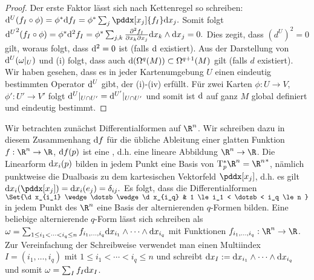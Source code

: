 \begin{st}
\begin{proof}
        Der erste Faktor lässt sich nach Kettenregel so schreiben:
        \begin{math}
            \d^U(f_I \circ \phi)
            = \phi^* \d f_I
            = \phi^* \sum_{j} \pddx[x_j]{f_I} \d x_j.
        \end{math}
        Somit folgt
        \begin{math}
            {\mathrm{d}^U}^2(f_I \circ \phi)
            = \phi^* \mathrm{d}^2 f_I
            = \phi^* \sum_{j,k} \frac{\partial^2 f_I}{\partial x_k \partial x_j} \mathrm{d} x_k \wedge \mathrm{d} x_j
            = 0.
        \end{math}
        Dies zegit, dass $(d^U)^2 = 0$ gilt, woraus folgt, dass $\mathrm{d}^2 = 0$ ist (falls $\mathrm{d}$ existiert).
        Aus der Darstellung von $\mathrm{d}^U(\omega|_U)$ und (i) folgt, dass auch $\mathrm{d}(\Omega^q(M)) \subset \Omega^{q+1}(M)$ gilt (falls $d$ existiert).
        Wir haben gesehen, dass es in jeder Kartenumgebung $U$ einen eindeutig bestimmten Operator $\mathrm{d}^U$ gibt, der (i)-(iv) erfüllt.
        Für zwei Karten  $\phi: U \to V$, $\phi': U' \to V'$ folgt $\mathrm{d}^U|_{U \cap U'} = \mathrm{d}^{U'}|_{U \cap U'}$ und somit ist $\mathrm{d}$ auf ganz $M$ global definiert und eindeutig bestimmt.
    \end{proof}
\end{st}

Wir betrachten zunächst Differentialformen auf $\R^n$.
Wir schreiben dazu in diesem Zusammenhang $\mathrm{d} f$ für die übliche Ableitung einer glatten Funktion $f:\R^n \to \R$, $\mathrm{d} f(p)$ ist eine , d.h. eine lineare Abbildung $\R^n \to \R$.
Die Linearform $\mathrm{d} x_i(p)$ bilden in jedem Punkt eine Basis von $\T_p^* \R^n = {\R^n}^*$, nämlich punktweise die Dualbasis zu dem kartesischen Vektorfeld $\pddx[x_j]$, d.h. es gilt
\begin{math}
    \d x_i (\pddx[x_j]) = \d x_i(e_j) = \delta_{ij}.
\end{math}
Es folgt, dass die Differentialformen
\begin{math}
    \Set{\d x_{i_1} \wedge \dotsb \wedge \d x_{i_q} & 1 \le i_1 < \dotsb < i_q \le n }
\end{math}
in jedem Punkt des $\R^n$ eine Basis der alternierenden $q$-Formen bilden.
Eine beliebige alternierende $q$-Form lässt sich schreiben als
\begin{math}
    \omega = \sum_{1 \le i_1 < \dotsb < i_q \le n} f_{i_1, \dotsc, i_q} \mathrm{d} x_{i_1} \wedge \dotsb \wedge \mathrm{d} x_{i_q}
\end{math}
mit Funktionen $f_{i_1, \dotsc, i_q}: \R^n \to \R$.
Zur Vereinfachung der Schreibweise verwendet man einen Multiindex $I = (i_1, \dotsc, i_q)$ mit $1 \le i_1 < \dotsb < i_q \le n$ und schreibt
\begin{math}
    \mathrm{d} x_I := \mathrm{d} x_{i_1} \wedge \dotsb \wedge \mathrm{d} x_{i_q}
\end{math}
und somit $\omega = \sum_I f_I \mathrm{d} x_I$.


